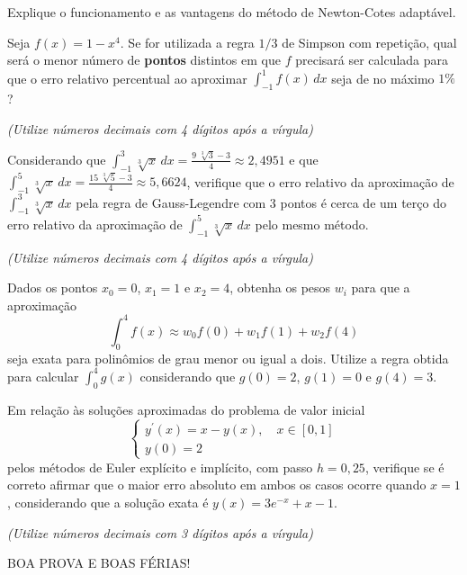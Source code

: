 \documentclass[12pt,a4paper]{article}
\newcommand{\fixme}{{\color{red}(...)}}
\begin{document}
\begin{ExerciseList}
\Exercise[title={1,0}]
Explique o funcionamento e as vantagens do método de Newton-Cotes adaptável.
\Answer \fixme

\Exercise[title={3,0}] Seja $f(x) = 1-x^4$. Se for utilizada a regra
$1/3$ de Simpson com repetição, qual será o menor número de \textbf{pontos} distintos em que $f$ precisará ser calculada para que o erro relativo percentual ao aproximar $\int_{-1}^1 f(x)\, dx$ seja de no máximo $1\%$?

{\color{blue} \textit{(Utilize números decimais com 4 dígitos após a vírgula)}}
\Answer \fixme


\Exercise[title={3,0}] Considerando que
$\int_{-1}^3 \sqrt[3]{x}\, dx
= \frac{9 \; \sqrt[3]{3} - 3}{4}
\approx 2,4951$
e que
$\int_{-1}^5 \sqrt[3]{x}\, dx
= \frac{15 \; \sqrt[3]{5} - 3}{4}
\approx 5,6624$, verifique que o erro relativo da aproximação de $\int_{-1}^3 \sqrt[3]{x}\, dx$ pela regra de Gauss-Legendre com 3 pontos é cerca de um terço do erro relativo da aproximação de $\int_{-1}^5 \sqrt[3]{x}\, dx$ pelo mesmo método.

{\color{blue} \textit{(Utilize números decimais com 4 dígitos após a vírgula)}}
\Answer \fixme

\Exercise[title={3,0}] Dados os pontos $x_0 = 0$, $x_1 = 1$ e $x_2 = 4$, obtenha os pesos $w_i$ para que a aproximação
\[
\int_{0}^{4} f(x) \approx w_0 f(0) + w_1 f(1) + w_2 f(4)
\]
seja exata para polinômios de grau menor ou igual a dois. Utilize a regra obtida para calcular $\int_{0}^{4} g(x)$ considerando que $g(0) = 2$, $g(1) = 0$ e $g(4) = 3$.
\Answer \fixme

\Exercise[title={3,0}]
Em relação às soluções aproximadas do problema de valor inicial
\[
\begin{cases}
y^\prime(x) = x - y(x), \quad x \in [0,1]\\
y(0) = 2
\end{cases}
\]
pelos métodos de Euler explícito e implícito, com passo $h=0,25$, verifique se é correto afirmar que o maior erro absoluto em ambos os casos ocorre quando $x = 1$, considerando que a solução exata é $y(x) = 3e^{-x}+x-1$.

{\color{blue} \textit{(Utilize números decimais com 3 dígitos após a vírgula)}}
\Answer \fixme
\end{ExerciseList}

\vspace{0.4cm}
\begin{center}
BOA PROVA E BOAS FÉRIAS!
\end{center}

\restoregeometry
\end{document}
